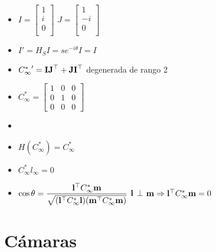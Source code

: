 \documentclass[12pt,a4paper]{article}
\begin{document}
\begin{itemize}
	\item $I = \left[ {\begin{smallmatrix}
	 1\\
	 i\\
	 0\\
	\end{smallmatrix} } \right]$
	$J = \left[ {\begin{smallmatrix}
	 1\\
	 -i\\
	 0\\
	\end{smallmatrix} } \right]$

	\item $I' = H_{S}I = se^{-i\theta}I = I$

	\item ${C^{*}_{\infty}}' = {\bf IJ}^{\top} + {\bf JI}^{\top}$ degenerada de rango 2

	\item $
	{C^{*}_{\infty}} =
	\left[ {\begin{smallmatrix}
	 1 & 0 & 0 \\
	 0 & 1 & 0 \\
	 0 & 0 & 0
	\end{smallmatrix} } \right]
	$

	\item %

	\item $H({C^{*}_{\infty}}) = {C^{*}_{\infty}}$

	\item ${C^{*}_{\infty}} l_{\infty} = 0$

	\item $\cos{\theta} = \dfrac{{\bf l}^{\top} {C^{*}_{\infty}} {\bf m}}
	{\sqrt{({\bf l}^{\top} {C^{*}_{\infty}} {\bf l})({\bf m}^{\top} {C^{*}_{\infty}} {\bf m}) }}$ \hspace{2cm} ${\bf l}$ $\bot$ ${\bf m} \Rightarrow {\bf l}^{\top} {C^{*}_{\infty}} {\bf m} = 0$

\end{itemize}

\section{C\'amaras}
\end{document}
